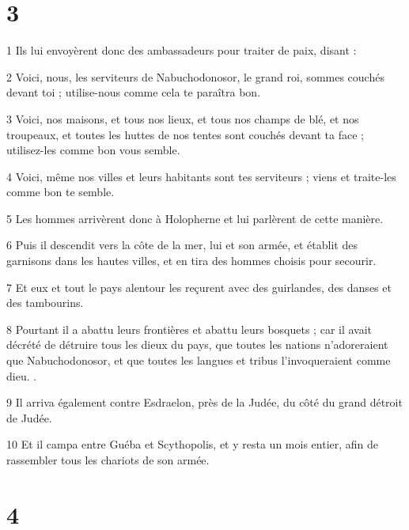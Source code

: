 \chapter{3}

\par 1 Ils lui envoyèrent donc des ambassadeurs pour traiter de paix, disant :
\par 2 Voici, nous, les serviteurs de Nabuchodonosor, le grand roi, sommes couchés devant toi ; utilise-nous comme cela te paraîtra bon.
\par 3 Voici, nos maisons, et tous nos lieux, et tous nos champs de blé, et nos troupeaux, et toutes les huttes de nos tentes sont couchés devant ta face ; utilisez-les comme bon vous semble.
\par 4 Voici, même nos villes et leurs habitants sont tes serviteurs ; viens et traite-les comme bon te semble.
\par 5 Les hommes arrivèrent donc à Holopherne et lui parlèrent de cette manière.
\par 6 Puis il descendit vers la côte de la mer, lui et son armée, et établit des garnisons dans les hautes villes, et en tira des hommes choisis pour secourir.
\par 7 Et eux et tout le pays alentour les reçurent avec des guirlandes, des danses et des tambourins.
\par 8 Pourtant il a abattu leurs frontières et abattu leurs bosquets ; car il avait décrété de détruire tous les dieux du pays, que toutes les nations n'adoreraient que Nabuchodonosor, et que toutes les langues et tribus l'invoqueraient comme dieu. .
\par 9 Il arriva également contre Esdraelon, près de la Judée, du côté du grand détroit de Judée.
\par 10 Et il campa entre Guéba et Scythopolis, et y resta un mois entier, afin de rassembler tous les chariots de son armée.

\chapter{4}

